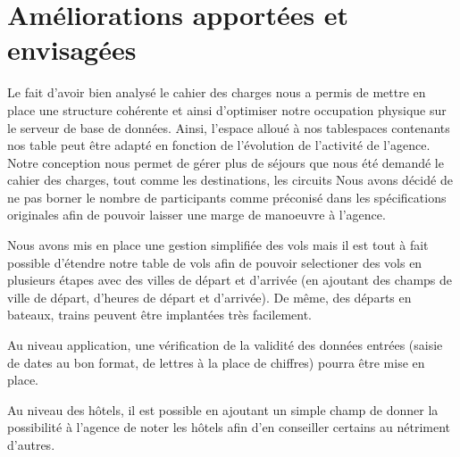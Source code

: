 \section{Am\'eliorations apport\'ees et envisag\'ees}

Le fait d'avoir bien analys\'e le cahier des charges nous a permis de mettre en place une structure coh\'erente et ainsi d'optimiser notre occupation physique sur le serveur de base de donn\'ees.
Ainsi, l'espace allou\'e \`a nos tablespaces contenants nos table peut \^etre adapt\'e en fonction de l'\'evolution de l'activit\'e de l'agence.\\

Notre conception nous permet de g\'erer plus de s\'ejours que nous \'et\'e demand\'e le cahier des charges, tout comme les destinations, les circuits
Nous avons d\'ecid\'e de ne pas borner le nombre de participants comme pr\'econis\'e dans les sp\'ecifications originales afin de pouvoir laisser une marge de manoeuvre \`a l'agence.

Nous avons mis en place une gestion simplifi\'ee des vols mais  il est tout \`a fait possible d'\'etendre notre table de vols afin de pouvoir selectioner des vols en plusieurs \'etapes avec des villes de d\'epart et d'arriv\'ee (en ajoutant des champs de ville de d\'epart, d'heures de d\'epart et d'arriv\'ee).
De m\^eme, des d\'eparts en bateaux, trains peuvent \^etre implant\'ees tr\`es facilement.

Au niveau application, une v\'erification de la validit\'e des donn\'ees entr\'ees (saisie de dates au bon format, de lettres \`a la place de chiffres) pourra \^etre mise en place.

Au niveau des h\^otels, il est possible en ajoutant un simple champ de donner la possibilit\'e \`a l'agence de noter les h\^otels afin d'en conseiller certains au n\'etriment d'autres.
